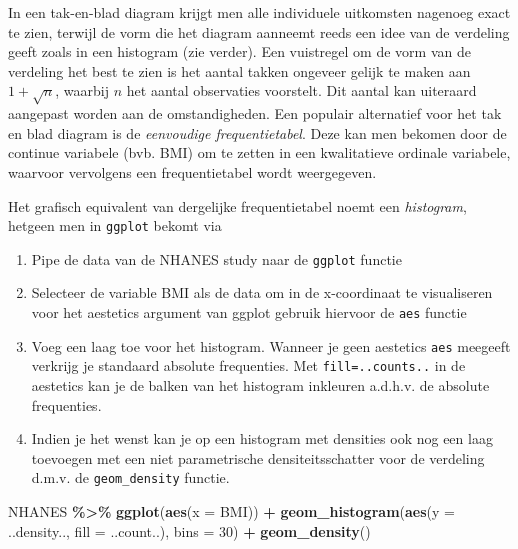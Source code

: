 \documentclass[
  12pt,dutch,coursenotes]{book}
\newenvironment{Shaded}{\begin{snugshade}}{\end{snugshade}}
\newcommand{\DataTypeTok}[1]{\textcolor[rgb]{0.13,0.29,0.53}{#1}}
\newcommand{\DecValTok}[1]{\textcolor[rgb]{0.00,0.00,0.81}{#1}}
\newcommand{\KeywordTok}[1]{\textcolor[rgb]{0.13,0.29,0.53}{\textbf{#1}}}
\newcommand{\NormalTok}[1]{#1}
\newcommand{\OperatorTok}[1]{\textcolor[rgb]{0.81,0.36,0.00}{\textbf{#1}}}
\newcommand{\StringTok}[1]{\textcolor[rgb]{0.31,0.60,0.02}{#1}}
\providecommand{\tightlist}{%
  \setlength{\itemsep}{0pt}\setlength{\parskip}{0pt}}
\theoremstyle{definition}
\theoremstyle{definition}
\theoremstyle{definition}
\theoremstyle{remark}
\begin{document}
In een tak-en-blad diagram krijgt men alle individuele uitkomsten nagenoeg
exact te zien, terwijl de vorm die het diagram aanneemt reeds een idee van
de verdeling geeft zoals in een histogram (zie verder). Een vuistregel om de
vorm van de verdeling het best te zien is het aantal takken ongeveer gelijk
te maken aan \(1 + \sqrt{n}\), waarbij \(n\) het aantal observaties voorstelt.
Dit aantal kan uiteraard aangepast worden aan de omstandigheden.
Een populair alternatief voor het tak en blad diagram is de \emph{eenvoudige frequentietabel}. Deze kan men bekomen door de continue variabele (bvb. BMI) om te zetten in een kwalitatieve ordinale variabele, waarvoor vervolgens een frequentietabel wordt weergegeven.

Het grafisch equivalent van dergelijke frequentietabel noemt een \emph{histogram}, hetgeen men in \texttt{ggplot} bekomt via

\begin{enumerate}
\def\labelenumi{\arabic{enumi}.}
\tightlist
\item
  Pipe de data van de NHANES study naar de \texttt{ggplot} functie
\item
  Selecteer de variable BMI als de data om in de x-coordinaat te visualiseren voor het aestetics argument van ggplot gebruik hiervoor de \texttt{aes} functie
\item
  Voeg een laag toe voor het histogram. Wanneer je geen aestetics \texttt{aes} meegeeft verkrijg je standaard absolute frequenties. Met \texttt{fill=..counts..} in de aestetics kan je de balken van het histogram inkleuren a.d.h.v. de absolute frequenties.
\item
  Indien je het wenst kan je op een histogram met densities ook nog een laag toevoegen met een niet parametrische densiteitsschatter voor de verdeling d.m.v. de \texttt{geom\_density} functie.
\end{enumerate}

\begin{Shaded}
\begin{Highlighting}[]
\NormalTok{NHANES }\OperatorTok{\%\textgreater{}\%}\StringTok{ }\KeywordTok{ggplot}\NormalTok{(}\KeywordTok{aes}\NormalTok{(}\DataTypeTok{x =}\NormalTok{ BMI)) }\OperatorTok{+}\StringTok{ }\KeywordTok{geom\_histogram}\NormalTok{(}\KeywordTok{aes}\NormalTok{(}\DataTypeTok{y =}\NormalTok{ ..density.., }
    \DataTypeTok{fill =}\NormalTok{ ..count..), }\DataTypeTok{bins =} \DecValTok{30}\NormalTok{) }\OperatorTok{+}\StringTok{ }\KeywordTok{geom\_density}\NormalTok{()}
\end{Highlighting}
\end{Shaded}
\end{document}
